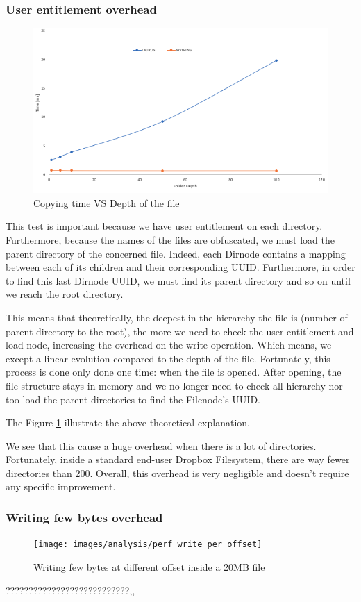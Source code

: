 \documentclass[../main.tex]{subfiles}
\begin{document}
\subsubsection{User entitlement overhead}
\label{section:analysis:user_entitlement_overhead}
\begin{figure}[h]
    \centering
    \includegraphics[width=.8\textwidth]{images/analysis/perf_write_per_depth}
    
    \caption{Copying time VS Depth of the file}
    \label{figure:analysis:perf_write_per_depth}
\end{figure}
\par This test is important because we have user entitlement on each directory. Furthermore, because the names of the files are obfuscated, we must load the parent directory of the concerned file. Indeed, each Dirnode contains a mapping between each of its children and their corresponding UUID. Furthermore, in order to find this last Dirnode UUID, we must find its parent directory and so on until we reach the root directory.
\par This means that theoretically, the deepest in the hierarchy the file is (number of parent directory to the root), the more we need to check the user entitlement and load node, increasing the overhead on the write operation. Which means, we except a linear evolution compared to the depth of the file. Fortunately, this process is done only done one time: when the file is opened. After opening, the file structure stays in memory and we no longer need to check all hierarchy nor too load the parent directories to find the Filenode's UUID.
\par The Figure \ref{figure:analysis:perf_write_per_depth} illustrate the above theoretical explanation.
\par We see that this cause a huge overhead when there is a lot of directories. Fortunately, inside a standard end-user Dropbox Filesystem, there are way fewer directories than 200. Overall, this overhead is very negligible and doesn't require any specific improvement.


\subsubsection{Writing few bytes overhead}
\label{section:analysis:write_offset_overhead}
\begin{figure}[h]
    \centering
    \texttt{[image: images/analysis/perf\_write\_per\_offset]}
    
    \caption{Writing few bytes at different offset inside a 20MB file}
    \label{figure:analysis:perf_write_per_offset}
\end{figure}
{???????????????????????????,,}
\end{document}
